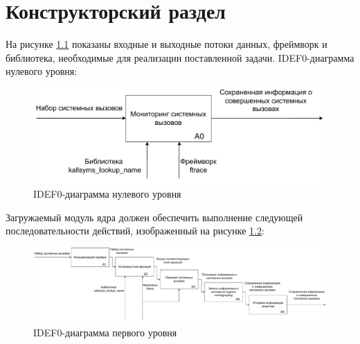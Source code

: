 \chapter{Конструкторский раздел}
\label{cha:design}




На рисунке \ref{idef0lvl0} показаны входные и выходные потоки данных,
фреймворк и библиотека, необходимые для реализации поставленной задачи.
IDEF0-диаграмма нулевого уровня:

\begin{figure}[h!]
	\centering
	\includegraphics[width=1.0\textwidth]{inc/IDEF0-lvl0.drawio.pdf}
	\caption{IDEF0-диаграмма нулевого уровня}
	\label{idef0lvl0}
\end{figure}


Загружаемый модуль ядра должен обеспечить выполнение следующей
последовательности действий, изображенный на рисунке \ref{idef0lvl1}:

\begin{figure}[h!]
	\centering
	\includegraphics[width=1.0\textwidth]{inc/IDEF0-lvl1.drawio.pdf}
	\caption{IDEF0-диаграмма первого уровня}
	\label{idef0lvl1}
\end{figure}

